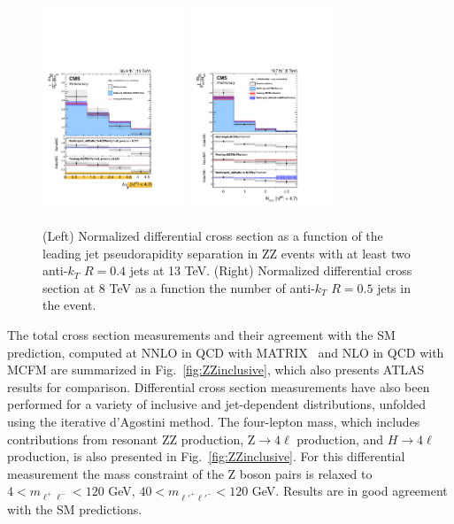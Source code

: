 \documentclass[10pt]{article}
\begin{document}
\begin{figure}[htb]
  \centering
    \includegraphics[height=2.4in]{figures/ZZ_13TeV_dEtajj_unfolded.pdf}
    \includegraphics[height=2.4in]{figures/ZZ_8TeV_nJets_unfolded.pdf}
  \caption{(Left) Normalized differential cross section as a function of the
          leading jet pseudorapidity separation in ZZ events with at least
          two anti-$k_{T}$ $R=0.4$ jets at 13 TeV. 
          (Right) Normalized differential cross section at 8 TeV
          as a function the number of anti-$k_{T}$ $R=0.5$ jets in the event.}
  \label{fig:ZZjets}
\end{figure}
The total cross section measurements and their agreement with the SM
prediction, computed at NNLO in QCD with \textsc{MATRIX}~\cite{Cascioli:2014yka}\cite{Grazzini:2015hta} 
and NLO in QCD with \textsc{MCFM}
are summarized in Fig.~\ref{fig:ZZinclusive}, which also presents ATLAS results for comparison. 
Differential cross section measurements have also been performed for a variety of inclusive 
and jet-dependent distributions, unfolded using the iterative d'Agostini method. 
The four-lepton mass, which includes contributions 
from resonant ZZ production, Z$\rightarrow 4\ell$ production, and $H \rightarrow 4\ell$ production,
is also presented in Fig.~\ref{fig:ZZinclusive}.
For this differential measurement the mass constraint of the Z boson pairs is relaxed to
$4 < m_{\ell^{+}\ell^{-}} < 120$ GeV, $40 < m_{\ell'^{+}\ell'^{-}} < 120$ GeV. 
Results are in good agreement with the SM predictions.
\end{document}
